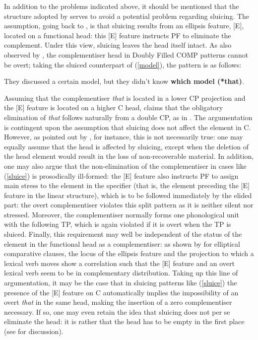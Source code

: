 In addition to the problems indicated above, it should be mentioned that the structure adopted by \citet{baltin2010} serves to avoid a potential problem regarding sluicing. The assumption, going back to \citet{merchant2001}, is that sluicing results from an ellipsis feature, [E], located on a functional head: this [E] feature instructs PF to eliminate the complement. Under this view, sluicing leaves the head itself intact. As also observed by \citet{baltin2010}, the complementiser head in Doubly Filled COMP patterns cannot be overt; taking the sluiced counterpart of (\ref{model}), the pattern is as follows:

\ea They discussed a certain model, but they didn't know \textbf{which model (*that)}. \label{sluice}
\z

Assuming that the complementiser \textit{that} is located in a lower CP projection and the [E] feature is located on a higher C head, \citet{baltin2010} claims that the obligatory elimination of \textit{that} follows naturally from a double CP, as in . The argumentation is contingent upon the assumption that sluicing does not affect the element in C. However, as pointed out by \citet[30--32]{bayer2015}, for instance, this is not necessarily true: one may equally assume that the head is affected by sluicing, except when the deletion of the head element would result in the loss of non-recoverable material. In addition, one may also argue that the non-elimination of the complementiser in cases like (\ref{sluice}) is prosodically ill-formed: the [E] feature also instructs PF to assign main stress to the element in the specifier (that is, the element preceding the [E] feature in the linear structure), which is to be followed immediately by the elided part: the overt complementiser violates this split pattern as it is neither silent nor stressed. Moreover, the complementiser normally forms one phonological unit with the following TP, which is again violated if it is overt when the TP is sluiced. Finally, this requirement may well be independent of the status of the element in the functional head as a complementiser: as shown by \citet[173--193]{bacskaiatkari2018langsci} for elliptical comparative clauses, the locus of the ellipsis feature and the projection to which a lexical verb moves show a correlation such that the [E] feature and an overt lexical verb seem to be in complementary distribution. Taking up this line of argumentation, it may be the case that in sluicing patterns like (\ref{sluice}) the presence of the [E] feature on C automatically implies the impossibility of an overt \textit{that} in the same head, making the insertion of a zero complementiser necessary. If so, one may even retain the idea that sluicing does not per se eliminate the head: it is rather that the head has to be empty in the first place (see  for discussion).

